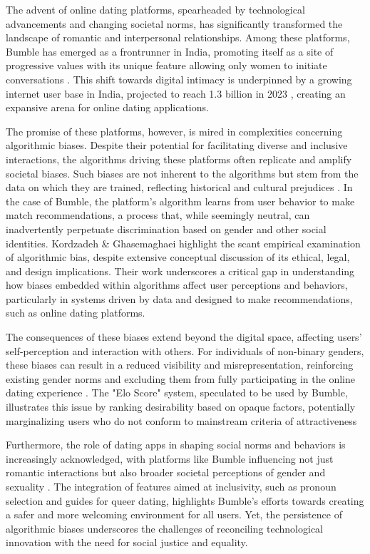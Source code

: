 The advent of online dating platforms, spearheaded by technological advancements and changing societal norms, has significantly transformed the landscape of romantic and interpersonal relationships. Among these platforms, Bumble has emerged as a frontrunner in India, promoting itself as a site of progressive values with its unique feature allowing only women to initiate conversations \cite{noauthor_bumble_nodate}. This shift towards digital intimacy is underpinned by a growing internet user base in India, projected to reach 1.3 billion in 2023 \cite{noauthor_india_nodate},  creating an expansive arena for online dating applications.

The promise of these platforms, however, is mired in complexities concerning algorithmic biases. Despite their potential for facilitating diverse and inclusive interactions, the algorithms driving these platforms often replicate and amplify societal biases. Such biases are not inherent to the algorithms but stem from the data on which they are trained, reflecting historical and cultural prejudices \cite{davidson-etal-2019-racial, Raghavan_Barocas_Kleinberg_Levy_2019}. In the case of Bumble, the platform's algorithm learns from user behavior to make match recommendations, a process that, while seemingly neutral, can inadvertently perpetuate discrimination based on gender and other social identities. Kordzadeh \& Ghasemaghaei highlight the scant empirical examination of algorithmic bias, despite extensive conceptual discussion of its ethical, legal, and design implications. Their work underscores a critical gap in understanding how biases embedded within algorithms affect user perceptions and behaviors, particularly in systems driven by data and designed to make recommendations, such as online dating platforms.

The consequences of these biases extend beyond the digital space, affecting users' self-perception and interaction with others. For individuals of non-binary genders, these biases can result in a reduced visibility and misrepresentation, reinforcing existing gender norms and excluding them from fully participating in the online dating experience \cite{Bivens_Hoque_2018, MacLeod_McArthur_2019}. The "Elo Score" system, speculated to be used by Bumble, illustrates this issue by ranking desirability based on opaque factors, potentially marginalizing users who do not conform to mainstream criteria of attractiveness \cite{Carr_2016}

Furthermore, the role of dating apps in shaping social norms and behaviors is increasingly acknowledged, with platforms like Bumble influencing not just romantic interactions but also broader societal perceptions of gender and sexuality \cite{Das_2019, Forbes_2020}. The integration of features aimed at inclusivity, such as pronoun selection and guides for queer dating, highlights Bumble's efforts towards creating a safer and more welcoming environment for all users. Yet, the persistence of algorithmic biases underscores the challenges of reconciling technological innovation with the need for social justice and equality.

